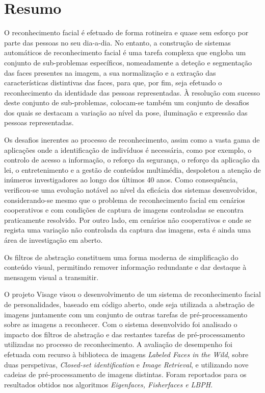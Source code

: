 \chapter*{Resumo}
O reconhecimento facial é efetuado de forma rotineira e quase sem esforço por parte das pessoas no seu dia-a-dia. No entanto, a construção de sistemas automáticos de reconhecimento facial é uma tarefa complexa que engloba um conjunto de sub-problemas específicos, nomeadamente a deteção e segmentação das faces presentes na imagem, a sua normalização e a extração das características distintivas das faces, para que, por fim, seja efetuado o reconhecimento da identidade das pessoas representadas. À resolução com sucesso deste conjunto de sub-problemas, colocam-se também um conjunto de desafios dos quais se destacam a variação ao nível da pose, iluminação e expressão das pessoas representadas.

Os desafios inerentes ao processo de reconhecimento, assim como a vasta gama de aplicações onde a identificação de indivíduos é necessária, como por exemplo, o controlo de acesso a informação, o reforço da segurança, o reforço da aplicação da lei, o entretenimento e a gestão de conteúdos multimédia, despoletou a atenção de inúmeros investigadores ao longo dos últimos 40 anos. Como consequência, verificou-se uma evolução notável ao nível da eficácia dos sistemas desenvolvidos, considerando-se mesmo que o problema de reconhecimento facial em cenários cooperativos e com condições de captura de imagens controladas se encontra praticamente resolvido. Por outro lado, em cenários não cooperativos e onde se regista uma variação não controlada da captura das imagens, esta é ainda uma área de investigação em aberto. 

Os filtros de abstração constituem uma forma moderna de simplificação do conteúdo visual, permitindo remover informação redundante e dar destaque à mensagem visual a transmitir.

O projeto Visage visou o desenvolvimento de um sistema de reconhecimento facial de personalidades, baseado em código aberto, onde seja utilizada a abstração de imagens juntamente com um conjunto de outras tarefas de pré-processamento sobre as imagens a reconhecer. Com o sistema desenvolvido foi analisado o impacto dos filtros de abstração e das restantes tarefas de pré-processamento utilizadas no processo de reconhecimento. A avaliação de desempenho foi efetuada com recurso à biblioteca de imagens \textit{Labeled Faces in the Wild}, sobre duas perspetivas, \textit{Closed-set identification} e \textit{Image Retrieval}, e utilizando nove cadeias de pré-processamento de imagens distintas. Foram reportados para os resultados obtidos nos algoritmos \textit{Eigenfaces, Fisherfaces e LBPH}.

